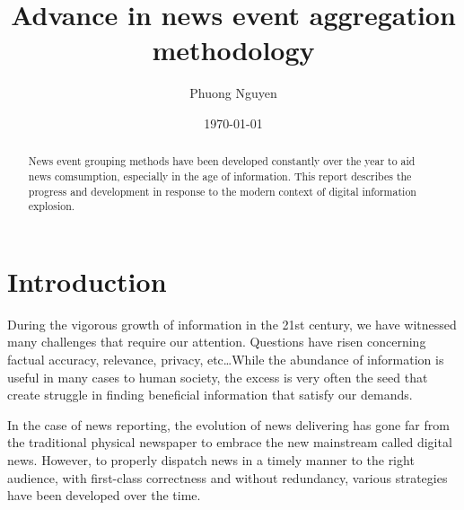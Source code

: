 \documentclass[english]{tktltiki}
\begin{document}
\onehalfspacing

\title{Advance in news event aggregation methodology}
\author{Phuong Nguyen}
\date{\today}

\maketitle




\begin{abstract}

News event grouping methods have been developed constantly over the year to aid news comsumption, especially in the age of information. This report describes the progress and development in response to the modern context of digital information explosion.

\end{abstract}

\mytableofcontents




\section{Introduction}

During the vigorous growth of information in the 21st century, we have witnessed many challenges that require our attention. Questions have risen concerning factual accuracy, relevance, privacy, etc\ldots While the abundance of information is useful in many cases to human society, the excess is very often the seed that create struggle in finding beneficial information that satisfy our demands.

In the case of news reporting, the evolution of news delivering has gone far from the traditional physical newspaper to embrace the new mainstream called digital news. However, to properly dispatch news in a timely manner to the right audience, with first-class correctness and without redundancy, various strategies have been developed over the time.
\end{document}
